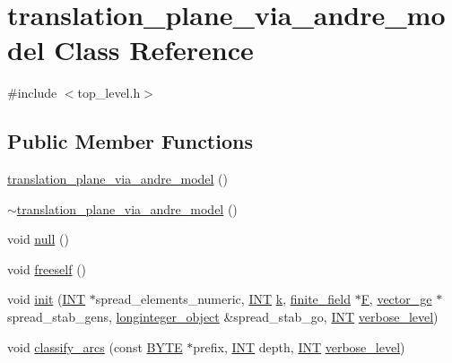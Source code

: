 \hypertarget{classtranslation__plane__via__andre__model}{}\section{translation\+\_\+plane\+\_\+via\+\_\+andre\+\_\+model Class Reference}
\label{classtranslation__plane__via__andre__model}


{\ttfamily \#include $<$top\+\_\+level.\+h$>$}

\subsection*{Public Member Functions}
\begin{DoxyCompactItemize}
\item 
\mbox{\hyperlink{classtranslation__plane__via__andre__model_a11fe9de1d73ad7a53c71b6299f115c9c}{translation\+\_\+plane\+\_\+via\+\_\+andre\+\_\+model}} ()
\item 
\mbox{\hyperlink{classtranslation__plane__via__andre__model_a73f07f56788e247084cb6ace667f0ca3}{$\sim$translation\+\_\+plane\+\_\+via\+\_\+andre\+\_\+model}} ()
\item 
void \mbox{\hyperlink{classtranslation__plane__via__andre__model_a92c9f5b286e62163e17e6baeeb5d3e18}{null}} ()
\item 
void \mbox{\hyperlink{classtranslation__plane__via__andre__model_a734ca0c38ef0fa02dc62ba1190dd75bc}{freeself}} ()
\item 
void \mbox{\hyperlink{classtranslation__plane__via__andre__model_adb424599de168ade331979a9218ee07b}{init}} (\mbox{\hyperlink{galois_8h_a09fddde158a3a20bd2dcadb609de11dc}{I\+NT}} $\ast$spread\+\_\+elements\+\_\+numeric, \mbox{\hyperlink{galois_8h_a09fddde158a3a20bd2dcadb609de11dc}{I\+NT}} \mbox{\hyperlink{classtranslation__plane__via__andre__model_a5b68c8ef402956680e2a4d467c78c79e}{k}}, \mbox{\hyperlink{classfinite__field}{finite\+\_\+field}} $\ast$\mbox{\hyperlink{classtranslation__plane__via__andre__model_abafc162683ca3e56e91fc4406d93c0d5}{F}}, \mbox{\hyperlink{classvector__ge}{vector\+\_\+ge}} $\ast$spread\+\_\+stab\+\_\+gens, \mbox{\hyperlink{classlonginteger__object}{longinteger\+\_\+object}} \&spread\+\_\+stab\+\_\+go, \mbox{\hyperlink{galois_8h_a09fddde158a3a20bd2dcadb609de11dc}{I\+NT}} \mbox{\hyperlink{simeon_8_c_a818073fbcc2f439e7c56952f67386122}{verbose\+\_\+level}})
\item 
void \mbox{\hyperlink{classtranslation__plane__via__andre__model_ac8f002e812a8b152d41e806688601c5e}{classify\+\_\+arcs}} (const \mbox{\hyperlink{galois_8h_ab6cc7b4aeb6ea31aba2b3fbfc83ff5e6}{B\+Y\+TE}} $\ast$prefix, \mbox{\hyperlink{galois_8h_a09fddde158a3a20bd2dcadb609de11dc}{I\+NT}} depth, \mbox{\hyperlink{galois_8h_a09fddde158a3a20bd2dcadb609de11dc}{I\+NT}} \mbox{\hyperlink{simeon_8_c_a818073fbcc2f439e7c56952f67386122}{verbose\+\_\+level}})

\end{DoxyCompactItemize}
